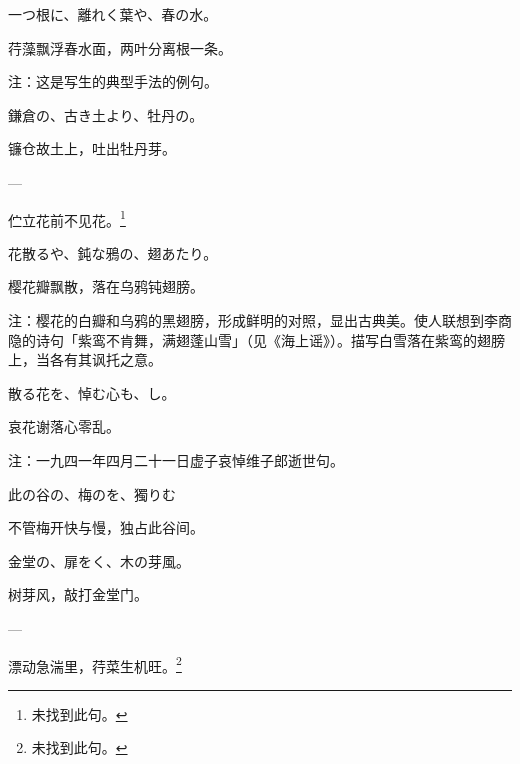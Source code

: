 \begin{haiku}
    {\FH 一つ根に、離れく葉や、春の水。}

    {\FK 荇藻飘浮春水面，两叶分离根一条。}

    {\FT 注：这是写生的典型手法的例句。}
\end{haiku}

\begin{haiku}
    {\FH 鎌倉の、古き土より、牡丹の。}

    {\FK 镰仓故土上，吐出牡丹芽。}
\end{haiku}

\begin{haiku}
    {\FH ---}

    {\FK 伫立花前不见花。\footnote{\FT 未找到此句。}}
\end{haiku}

\begin{haiku}
    {\FH 花散るや、鈍な鴉の、翅あたり。}

    {\FK 樱花瓣飘散，落在乌鸦钝翅膀。}

    {\FT 注：樱花的白瓣和乌鸦的黑翅膀，形成鲜明的对照，显出古典美。使人联想到李商隐的诗句「紫鸾不肯舞，满翅蓬山雪」（见《海上谣》）。描写白雪落在紫鸾的翅膀上，当各有其讽托之意。}
\end{haiku}

\begin{haiku}
    {\FH 散る花を、悼む心も、し。}

    {\FK 哀花谢落心零乱。}

    {\FT 注：一九四一年四月二十一日虚子哀悼维子郎逝世句。}
\end{haiku}

\begin{haiku}
    {\FH 此の谷の、梅のを、獨りむ}

    {\FK 不管梅开快与慢，独占此谷间。}
\end{haiku}

\begin{haiku}
    {\FH 金堂の、扉をく、木の芽風。}

    {\FK 树芽风，敲打金堂门。}
\end{haiku}

\begin{haiku}
    {\FH ---}

    {\FK 漂动急湍里，荇菜生机旺。\footnote{\FT 未找到此句。}}
\end{haiku}

